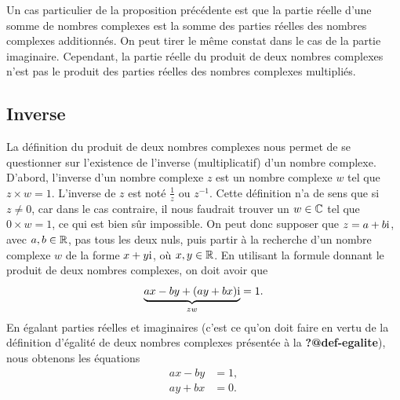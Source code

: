 \documentclass[
  letterpaper,
  DIV=11,
  numbers=noendperiod,
  oneside]{scrreprt}
\theoremstyle{definition}
\theoremstyle{remark}
\begin{document}
Un cas particulier de la proposition précédente est que la partie réelle
d'une somme de nombres complexes est la somme des parties réelles des
nombres complexes additionnés. On peut tirer le même constat dans le cas
de la partie imaginaire. Cependant, la partie réelle du produit de deux
nombres complexes n'est pas le produit des parties réelles des nombres
complexes multipliés.


\hypertarget{inverse}{%
\subsection{Inverse}\label{inverse}}

La définition du produit de deux nombres complexes nous permet de se
questionner sur l'existence de l'inverse (multiplicatif) d'un nombre
complexe. D'abord, l'inverse d'un nombre complexe \(z\) est un nombre
complexe \(w\) tel que \(z\times w=1\). L'inverse de \(z\) est noté
\(\frac{1}{z}\) ou \(z^{-1}\). Cette définition n'a de sens que si
\(z\neq 0\), car dans le cas contraire, il nous faudrait trouver un
\(w\in\mathbb{C}\) tel que \(0\times w=1\), ce qui est bien sûr impossible. On
peut donc supposer que \(z=a+b\textrm{i}\), avec \(a,b\in\mathbb{R}\), pas tous les
deux nuls, puis partir à la recherche d'un nombre complexe \(w\) de la
forme \(x+y\textrm{i}\), où \(x,y\in\mathbb{R}\). En utilisant la formule donnant le
produit de deux nombres complexes, on doit avoir que
\[\underbrace{ax-by +(ay+bx)\textrm{i}}_{zw}=1.\] En égalant parties réelles et
imaginaires (c'est ce qu'on doit faire en vertu de la définition
d'égalité de deux nombres complexes présentée à la
\textbf{?@def-egalite}), nous obtenons les équations \begin{align}
ax-by&=1,\\
ay+bx&=0.
\end{align}
\end{document}
